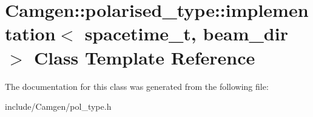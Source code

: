 \hypertarget{a00294}{\section{Camgen\-:\-:polarised\-\_\-type\-:\-:implementation$<$ spacetime\-\_\-t, beam\-\_\-dir $>$ Class Template Reference}
\label{a00294}
}


The documentation for this class was generated from the following file\-:\begin{DoxyCompactItemize}
\item 
include/\-Camgen/pol\-\_\-type.\-h\end{DoxyCompactItemize}
